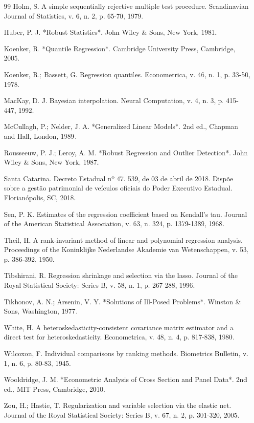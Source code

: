 \documentclass[12pt,a4paper]{article}
\begin{document}
\begin{thebibliography}{99}
 Holm, S. A simple sequentially rejective multiple test procedure. Scandinavian Journal of Statistics, v. 6, n. 2, p. 65-70, 1979.

 Huber, P. J. *Robust Statistics*. John Wiley \& Sons, New York, 1981.

 Koenker, R. *Quantile Regression*. Cambridge University Press, Cambridge, 2005.

 Koenker, R.; Bassett, G. Regression quantiles. Econometrica, v. 46, n. 1, p. 33-50, 1978.

 MacKay, D. J. Bayesian interpolation. Neural Computation, v. 4, n. 3, p. 415-447, 1992.

 McCullagh, P.; Nelder, J. A. *Generalized Linear Models*. 2nd ed., Chapman and Hall, London, 1989.

 Rousseeuw, P. J.; Leroy, A. M. *Robust Regression and Outlier Detection*. John Wiley \& Sons, New York, 1987.

 Santa Catarina. Decreto Estadual nº 47. 539, de 03 de abril de 2018. Dispõe sobre a gestão patrimonial de veículos oficiais do Poder Executivo Estadual. Florianópolis, SC, 2018.

 Sen, P. K. Estimates of the regression coefficient based on Kendall's tau. Journal of the American Statistical Association, v. 63, n. 324, p. 1379-1389, 1968.

 Theil, H. A rank-invariant method of linear and polynomial regression analysis. Proceedings of the Koninklijke Nederlandse Akademie van Wetenschappen, v. 53, p. 386-392, 1950.

 Tibshirani, R. Regression shrinkage and selection via the lasso. Journal of the Royal Statistical Society: Series B, v. 58, n. 1, p. 267-288, 1996.

 Tikhonov, A. N.; Arsenin, V. Y. *Solutions of Ill-Posed Problems*. Winston \& Sons, Washington, 1977.

 White, H. A heteroskedasticity-consistent covariance matrix estimator and a direct test for heteroskedasticity. Econometrica, v. 48, n. 4, p. 817-838, 1980.

 Wilcoxon, F. Individual comparisons by ranking methods. Biometrics Bulletin, v. 1, n. 6, p. 80-83, 1945.

 Wooldridge, J. M. *Econometric Analysis of Cross Section and Panel Data*. 2nd ed., MIT Press, Cambridge, 2010.

 Zou, H.; Hastie, T. Regularization and variable selection via the elastic net. Journal of the Royal Statistical Society: Series B, v. 67, n. 2, p. 301-320, 2005.

\end{thebibliography}
\end{document}
